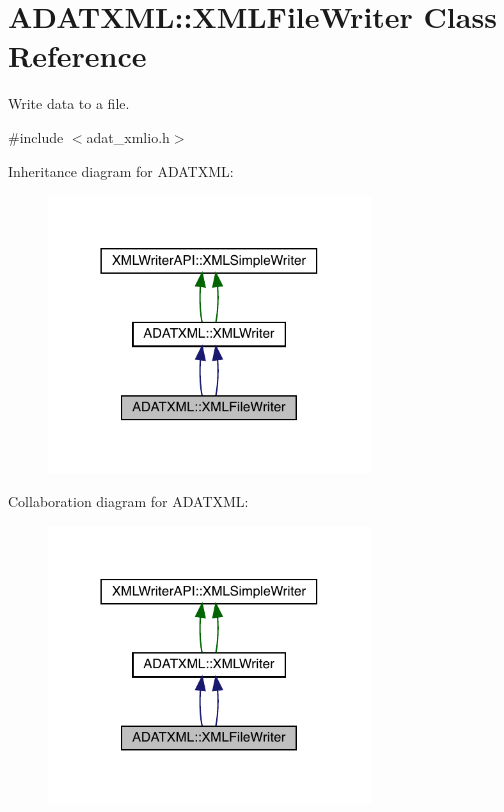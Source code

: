 \hypertarget{classADATXML_1_1XMLFileWriter}{}\section{A\+D\+A\+T\+X\+ML\+:\+:X\+M\+L\+File\+Writer Class Reference}
\label{classADATXML_1_1XMLFileWriter}


Write data to a file.  




{\ttfamily \#include $<$adat\+\_\+xmlio.\+h$>$}



Inheritance diagram for A\+D\+A\+T\+X\+ML\+:\nopagebreak
\begin{figure}[H]
\begin{center}
\leavevmode
\includegraphics[width=242pt]{d6/da7/classADATXML_1_1XMLFileWriter__inherit__graph}
\end{center}
\end{figure}


Collaboration diagram for A\+D\+A\+T\+X\+ML\+:\nopagebreak
\begin{figure}[H]
\begin{center}
\leavevmode
\includegraphics[width=242pt]{d8/dd7/classADATXML_1_1XMLFileWriter__coll__graph}
\end{center}
\end{figure}
